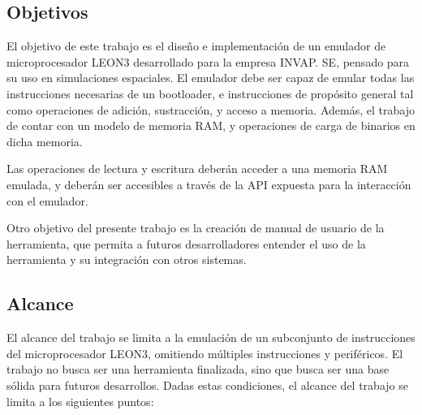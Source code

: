 \subsection{Objetivos}
\label{subsec:objetivos}

El objetivo de este trabajo es el diseño e implementación de un emulador de microprocesador LEON3 desarrollado para la empresa INVAP. SE, pensado para su uso en simulaciones espaciales. El emulador debe ser capaz de emular todas las instrucciones necesarias de un bootloader, e instrucciones de propósito general tal como operaciones de adición, sustracción, y acceso a memoria. Además, el trabajo de contar con un modelo de memoria RAM, y operaciones de carga de binarios en dicha memoria.

Las operaciones de lectura y escritura deberán acceder a una memoria RAM emulada, y deberán ser accesibles a través de la API expuesta para la interacción con el emulador.

Otro objetivo del presente trabajo es la creación de manual de usuario de la herramienta, que permita a futuros desarrolladores entender el uso de la herramienta y su integración con otros sistemas.

\subsection{Alcance}
\label{subsec:alcance}

El alcance del trabajo se limita a la emulación de un subconjunto de instrucciones del microprocesador LEON3, omitiendo múltiples instrucciones y periféricos. El trabajo no busca ser una herramienta finalizada, sino que busca ser una base sólida para futuros desarrollos. Dadas estas condiciones, el alcance del trabajo se limita a los siguientes puntos:

